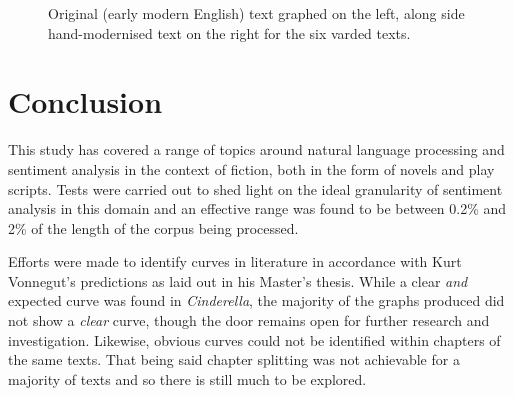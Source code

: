 \documentclass{article}
\begin{document}
{\begin{figure}
            \centering
            \caption{Original (early modern English) text graphed on the left, along side hand-modernised text on the right for the six varded texts.}
            \label{fig:emvsm}
        \end{figure}
\newpage
\section{Conclusion}
    This study has covered a range of topics around natural language processing and sentiment analysis in the context of fiction, both in the form of novels and play scripts. Tests were carried out to shed light on the ideal granularity of sentiment analysis in this domain and an effective range was found to be between 0.2\% and 2\% of the length of the corpus being processed.
    
    Efforts were made to identify curves in literature in accordance with Kurt Vonnegut's predictions as laid out in his Master's thesis. While a clear \textit{and} expected curve was found in \textit{Cinderella}, the majority of the graphs produced did not show a \textit{clear} curve, though the door remains open for further research and investigation. Likewise, obvious curves could not be identified within chapters of the same texts. That being said chapter splitting was not achievable for a majority of texts and so there is still much to be explored.
    
}
\end{document}
